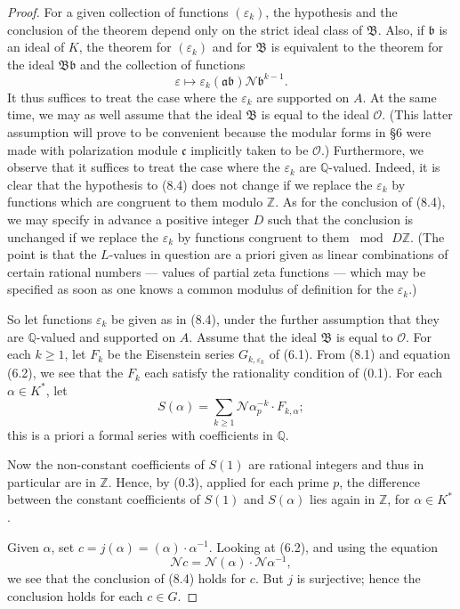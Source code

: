 \documentclass[12pt,a4paper]{article}
\theoremstyle{plain}
\theoremstyle{definition}
\theoremstyle{remark}
\begin{document}
\begin{proof}
For a given collection of functions $(\varepsilon_k)$, the hypothesis and the conclusion of the theorem depend only on the strict ideal class of $\mathfrak{B}$. Also, if $\mathfrak{b}$ is an ideal of $K$, the theorem for $(\varepsilon_k)$ and for $\mathfrak{B}$ is equivalent to the theorem for the ideal $\mathfrak{B}\mathfrak{b}$ and the collection of functions
\[
\varepsilon \mapsto \varepsilon_k(\mathfrak{a}\mathfrak{b}) \mathcal{N}\mathfrak{b}^{k-1}.
\]
It thus suffices to treat the case where the $\varepsilon_k$ are supported on $A$. At the same time, we may as well assume that the ideal $\mathfrak{B}$ is equal to the ideal $\mathcal{O}$. (This latter assumption will prove to be convenient because the modular forms in \S6 were made with polarization module $\mathfrak{c}$ implicitly taken to be $\mathcal{O}$.) Furthermore, we observe that it suffices to treat the case where the $\varepsilon_k$ are $\mathbb{Q}$-valued. Indeed, it is clear that the hypothesis to (8.4) does not change if we replace the $\varepsilon_k$ by functions which are congruent to them modulo $\mathbb{Z}$. As for the conclusion of (8.4), we may specify in advance a positive integer $D$ such that the conclusion is unchanged if we replace the $\varepsilon_k$ by functions congruent to them $\bmod\, D\mathbb{Z}$. (The point is that the $L$-values in question are a priori given as linear combinations of certain rational numbers --- values of partial zeta functions --- which may be specified as soon as one knows a common modulus of definition for the $\varepsilon_k$.)

So let functions $\varepsilon_k$ be given as in (8.4), under the further assumption that they are $\mathbb{Q}$-valued and supported on $A$. Assume that the ideal $\mathfrak{B}$ is equal to $\mathcal{O}$. For each $k \ge 1$, let $F_k$ be the Eisenstein series $G_{k,\varepsilon_k}$ of (6.1). From (8.1) and equation (6.2), we see that the $F_k$ each satisfy the rationality condition of (0.1). For each $\alpha \in K^*$, let
\[
S(\alpha) = \sum_{k \ge 1} \mathcal{N}\alpha_p^{-k} \cdot F_{k,\alpha};
\]
this is a priori a formal series with coefficients in $\mathbb{Q}$.

Now the non-constant coefficients of $S(1)$ are rational integers and thus in particular are in $\mathbb{Z}$. Hence, by (0.3), applied for each prime $p$, the difference between the constant coefficients of $S(1)$ and $S(\alpha)$ lies again in $\mathbb{Z}$, for $\alpha \in K^*$.

Given $\alpha$, set $c = j(\alpha) = (\alpha) \cdot \alpha^{-1}$. Looking at (6.2), and using the equation
\[
\mathcal{N}c = \mathcal{N}(\alpha) \cdot \mathcal{N}\alpha^{-1},
\]
we see that the conclusion of (8.4) holds for $c$. But $j$ is surjective; hence the conclusion holds for each $c \in G$.
\end{proof}
\end{document}
